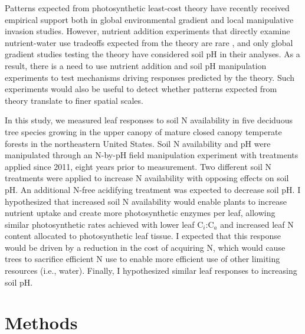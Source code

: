Patterns expected from photosynthetic least-cost theory have recently received empirical support both in global environmental gradient  and local manipulative invasion  studies. However, nutrient addition experiments that directly examine nutrient-water use tradeoffs expected from the theory are rare , and only global gradient studies testing the theory have considered soil pH in their analyses. As a result, there is a need to use nutrient addition and soil pH manipulation experiments to test mechanisms driving responses predicted by the theory. Such experiments would also be useful to detect whether patterns expected from theory translate to finer spatial scales.

In this study, we measured leaf responses to soil N availability in five deciduous tree species growing in the upper canopy of mature closed canopy temperate forests in the northeastern United States. Soil N availability and pH were manipulated through an N-by-pH field manipulation experiment with treatments applied since 2011, eight years prior to measurement. Two different soil N treatments were applied to increase N availability with opposing effects on soil pH. An additional N-free acidifying treatment was expected to decrease soil pH. I hypothesized that increased soil N availability would enable plants to increase nutrient uptake and create more photosynthetic enzymes per leaf, allowing similar photosynthetic rates achieved with lower leaf C$_{i}$:C$_{a}$ and increased leaf N content allocated to photosynthetic leaf tissue. I expected that this response would be driven by a reduction in the cost of acquiring N, which would cause trees to sacrifice efficient N use to enable more efficient use of other limiting resources (i.e., water). Finally, I hypothesized similar leaf responses to increasing soil pH.

\section{Methods}
